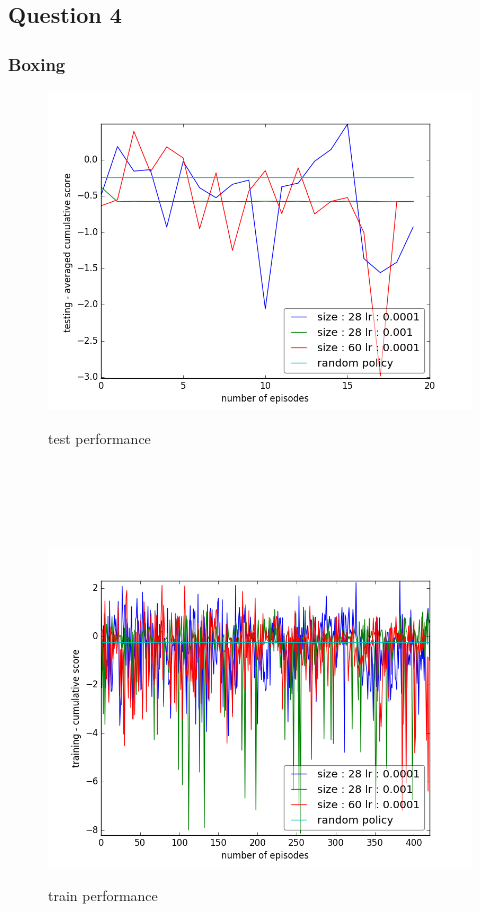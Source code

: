 \documentclass{report}
\begin{document}
\subsection*{Question 4}


\subsubsection*{Boxing}


\begin{figure}[H]
\begin{minipage}[c]{.49\linewidth}
	\centering
	\includegraphics[width = \linewidth]{plots/b3/Boxing-v3/testScoreMean.png}
	\caption{test performance}
    \end{minipage}
    \hfill%
\begin{minipage}[c]{.49\linewidth}
    \centering 
    \includegraphics[width = \linewidth]{plots/b3/Boxing-v3/trainScore.png}
	\caption{train performance}
\end{minipage}
\end{figure}
\end{document}
